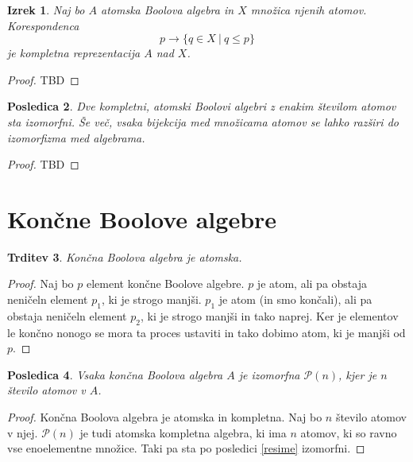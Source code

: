 \documentclass{amsart}
\newtheorem{izrek}{Izrek}[section]
\newtheorem{trditev}[izrek]{Trditev}
\newtheorem{posledica}[izrek]{Posledica}
\begin{document}
\begin{izrek}
    Naj bo $A$ atomska Boolova algebra in $X$ množica njenih atomov.
    Korespondenca
    \[p \to \{q\in X~|~q\leq p\}\]
    je kompletna reprezentacija $A$ nad $X$.
\end{izrek}

\begin{proof}
    TBD
\end{proof}

\begin{posledica}
    Dve kompletni, atomski Boolovi algebri z enakim številom atomov sta izomorfni.
    Še več, vsaka bijekcija med množicama atomov se lahko razširi do 
    izomorfizma med algebrama.
\end{posledica}

\begin{proof}
    TBD
\end{proof}



\section{Končne Boolove algebre}

\begin{trditev}
    Končna Boolova algebra je atomska.
\end{trditev}

\begin{proof}
    Naj bo \(p\) element končne Boolove algebre. \(p\) je atom, ali pa obstaja 
    neničeln element \(p_1\), ki je strogo manjši. \(p_1\) je atom (in smo končali), ali pa obstaja 
    neničeln element \(p_2\), ki je strogo manjši in tako naprej. Ker je elementov 
    le končno nonogo se mora ta proces ustaviti
    in tako dobimo atom, ki je manjši od \(p\).
\end{proof}

\begin{posledica}
    Vsaka končna Boolova algebra $A$ je izomorfna $\mathcal{P}(n)$, kjer je $n$ število 
    atomov v $A$.
\end{posledica}

\begin{proof}
    Končna Boolova algebra je atomska in kompletna. Naj bo $n$ število atomov v njej.
    $\mathcal{P}(n)$ je tudi atomska kompletna algebra, ki ima $n$ atomov, ki so 
    ravno vse enoelementne množice. Taki pa sta po posledici \ref{resime} izomorfni.
\end{proof}
\end{document}
